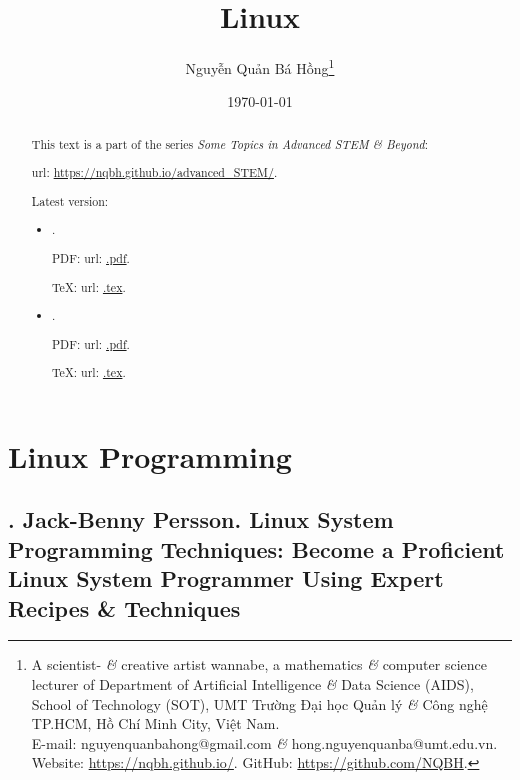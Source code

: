 \documentclass{article}
\title{Linux}
\author{Nguyễn Quản Bá Hồng\footnote{A scientist- {\it\&} creative artist wannabe, a mathematics {\it\&} computer science lecturer of Department of Artificial Intelligence {\it\&} Data Science (AIDS), School of Technology (SOT), UMT Trường Đại học Quản lý {\it\&} Công nghệ TP.HCM, Hồ Chí Minh City, Việt Nam.\\E-mail: {\sf nguyenquanbahong@gmail.com} {\it\&} {\sf hong.nguyenquanba@umt.edu.vn}. Website: \url{https://nqbh.github.io/}. GitHub: \url{https://github.com/NQBH}.}}
\date{\today}
\begin{document}
\maketitle
\begin{abstract}
    This text is a part of the series {\it Some Topics in Advanced STEM \& Beyond}:
    
    {\sc url}: \url{https://nqbh.github.io/advanced_STEM/}.
    
    Latest version:
    \begin{itemize}
        \item {\it }.
        
        PDF: {\sc url}: \url{.pdf}.
        
        \TeX: {\sc url}: \url{.tex}.
        \item {\it }.
        
        PDF: {\sc url}: \url{.pdf}.
        
        \TeX: {\sc url}: \url{.tex}.
    \end{itemize}
\end{abstract}
\tableofcontents


\section{Linux Programming}

\subsection{\cite{Persson2021}. {\sc Jack-Benny Persson}. Linux System Programming Techniques: Become a Proficient Linux System Programmer Using Expert Recipes \& Techniques}
\end{document}
